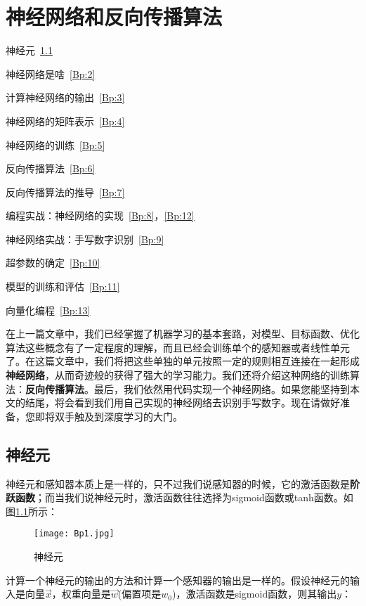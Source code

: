 \chapter{神经网络和反向传播算法}\label{chap:Bp}

\begin{introduction}
	\item 神经元~\ref{Bp:1}
	\item 神经网络是啥~\ref{Bp:2}
	\item 计算神经网络的输出~\ref{Bp:3}
	\item 神经网络的矩阵表示~\ref{Bp:4}
	\item 神经网络的训练~\ref{Bp:5}
	\item 反向传播算法~\ref{Bp:6}
	\item 反向传播算法的推导~\ref{Bp:7}
	\item 编程实战：神经网络的实现~\ref{Bp:8}，\ref{Bp:12}
	\item 神经网络实战：手写数字识别~\ref{Bp:9}
	\item 超参数的确定~\ref{Bp:10}
	\item 模型的训练和评估~\ref{Bp:11}
	\item 向量化编程~\ref{Bp:13}
\end{introduction}

在上一篇文章中，我们已经掌握了机器学习的基本套路，对模型、目标函数、优化算法这些概念有了一定程度的理解，而且已经会训练单个的感知器或者线性单元了。在这篇文章中，我们将把这些单独的单元按照一定的规则相互连接在一起形成\textbf{神经网络}，从而奇迹般的获得了强大的学习能力。我们还将介绍这种网络的训练算法：\textbf{反向传播算法}。最后，我们依然用代码实现一个神经网络。如果您能坚持到本文的结尾，将会看到我们用自己实现的神经网络去识别手写数字。现在请做好准备，您即将双手触及到深度学习的大门。


\section{神经元}\label{Bp:1}

神经元和感知器本质上是一样的，只不过我们说感知器的时候，它的激活函数是\textbf{阶跃函数}；而当我们说神经元时，激活函数往往选择为sigmoid函数或tanh函数。如图\ref{fig:Bp1}所示：

\begin{figure}[htbp]
	\centering
	\texttt{[image: Bp1.jpg]}
	\caption{神经元}
	\label{fig:Bp1}
\end{figure}

计算一个神经元的输出的方法和计算一个感知器的输出是一样的。假设神经元的输入是向量\(\vec{x}\)，权重向量是\(\vec{w}\)(偏置项是\(w_0\))，激活函数是sigmoid函数，则其输出\(y\)：

